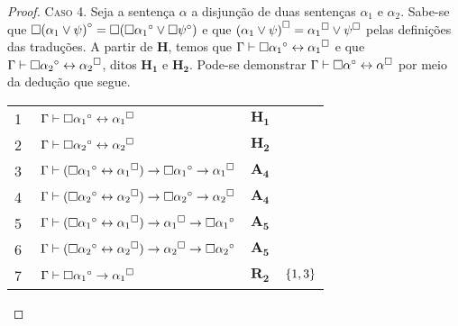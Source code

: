 \begin{tcolorbox}[enhanced jigsaw, breakable, sharp corners, colframe=black, colback=white, boxrule=0.5pt, left=1.5mm, right=1.5mm, top=1.5mm, bottom=1.5mm]
\begin{theorem}
\begin{proof}
        \vspace{.5\baselineskip}
        \textsc{Caso 4.}
        Seja a sentença $\alpha$ a disjunção de duas sentenças ${\alpha_1}$ e ${\alpha_2}$.
        Sabe-se que $\Box{({\alpha_1}\vee\psi)}^\circ=\Box(\Box{\alpha_1}^\circ\vee\Box\psi^\circ)$ e que ${({\alpha_1}\vee\psi)}^\Box={\alpha_1}^\Box\vee\psi^\Box$ pelas definições das traduções.
        A partir de $\mathbf{H}$, temos que $\Gamma\mathrel{\vdash}\Box{\alpha_1}^\circ\leftrightarrow{\alpha_1}^\Box$ e que $\Gamma\mathrel{\vdash}\Box{\alpha_2}^\circ\leftrightarrow{\alpha_2}^\Box$, ditos $\mathbf{H_1}$ e $\mathbf{H_2}$.
        Pode-se demonstrar $\Gamma\mathrel{\vdash}\Box\alpha^\circ\leftrightarrow\alpha^\Box$ por meio da dedução que segue.

        \vspace{.5\baselineskip}
        \footnotesize
        \setlength{\rowskip}{.5\baselineskip}
        \begin{xltabular}{\textwidth}{r | X l l}
            \scriptsize{\phantom{0}1}\phantom{ } & $\ \Gamma \vdash \Box{\alpha_1}^\circ \leftrightarrow {\alpha_1}^\Box$ & $\mathbf{H_1}$ & \\[\rowskip]
            \scriptsize{\phantom{0}2}\phantom{ } & $\ \Gamma \vdash \Box{\alpha_2}^\circ \leftrightarrow {\alpha_2}^\Box$ & $\mathbf{H_2}$ & \\[\rowskip]
            \scriptsize{\phantom{0}3}\phantom{ } & $\ \Gamma \vdash (\Box{\alpha_1}^\circ \leftrightarrow {\alpha_1}^\Box) \to \Box{\alpha_1}^\circ \to {\alpha_1}^\Box$ & $\hyperref[modal.axiom.4]{\mathbf{A_4}}$ & \\[\rowskip]
            \scriptsize{\phantom{0}4}\phantom{ } & $\ \Gamma \vdash (\Box{\alpha_2}^\circ \leftrightarrow {\alpha_2}^\Box) \to \Box{\alpha_2}^\circ \to {\alpha_2}^\Box$ & $\hyperref[modal.axiom.4]{\mathbf{A_4}}$ & \\[\rowskip]
            \scriptsize{\phantom{0}5}\phantom{ } & $\ \Gamma \vdash (\Box{\alpha_1}^\circ \leftrightarrow {\alpha_1}^\Box) \to {\alpha_1}^\Box \to \Box{\alpha_1}^\circ$ & $\hyperref[modal.axiom.5]{\mathbf{A_5}}$ & \\[\rowskip]
            \scriptsize{\phantom{0}6}\phantom{ } & $\ \Gamma \vdash (\Box{\alpha_2}^\circ \leftrightarrow {\alpha_2}^\Box) \to {\alpha_2}^\Box \to \Box{\alpha_2}^\circ$ & $\hyperref[modal.axiom.5]{\mathbf{A_5}}$ & \\[\rowskip]
            \scriptsize{\phantom{0}7}\phantom{ } & $\ \Gamma \vdash \Box{\alpha_1}^\circ \to {\alpha_1}^\Box$ & $\hyperref[modal.rule.2]{\mathbf{R_2}}$ & $\left\{1,3\right\}$\\[\rowskip]

\end{xltabular}
\end{proof}
\end{theorem}
\end{tcolorbox}
